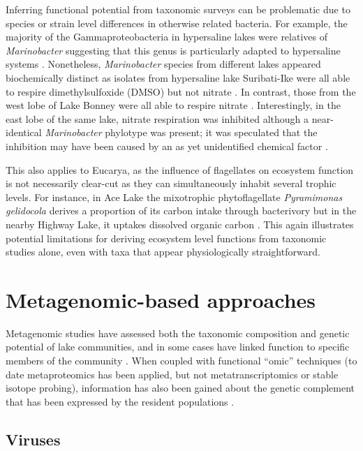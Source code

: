 Inferring functional potential from taxonomic surveys can be problematic due to species or strain level differences in otherwise related bacteria.
For example, the majority of the Gammaproteobacteria in hypersaline lakes were relatives of \textit{Marinobacter} suggesting that this genus is particularly adapted to hypersaline systems
\cite{Bowman2000b, Glatz2006, Matsuzaki2006, Mosier2007}.
Nonetheless, \textit{Marinobacter} species from different lakes appeared biochemically distinct
 as isolates from hypersaline lake Suribati-Ike were all able to respire dimethylsulfoxide (DMSO) but not nitrate \cite{Matsuzaki2006}. 
In contrast, those from the west lobe of Lake Bonney were all able to respire nitrate \cite{Ward1997}. 
Interestingly, in the east lobe of the same lake, nitrate respiration was inhibited although a near-identical \textit{Marinobacter} phylotype was present; 
it was speculated that the inhibition may have been caused by an as yet unidentified chemical factor \cite{Ward2005, Glatz2006}. 

This also applies to Eucarya, as the influence of flagellates on ecosystem function is not necessarily clear-cut as they can simultaneously inhabit several trophic levels. 
For instance, in Ace Lake the mixotrophic phytoflagellate \textit{Pyramimonas gelidocola} derives a proportion of its carbon intake through bacterivory \cite{Bell2003} 
but in the nearby Highway Lake, it uptakes dissolved organic carbon \cite{Laybourn-Parry2005}. 
This again illustrates potential limitations for deriving ecosystem level functions from taxonomic studies alone, even with taxa that appear physiologically straightforward. 

\section{Metagenomic-based approaches}
Metagenomic studies have assessed both the taxonomic composition and genetic potential of lake communities, and in some cases have linked function to specific members of the community 
\cite{Lopez-Bueno2009, Ng2010, Lauro2011, Yau2011, Varin2012}.%
When coupled with functional ``omic'' techniques (to date metaproteomics has been applied, but not metatranscriptomics or stable isotope probing), 
information has also been gained about the genetic complement that has been expressed by the resident populations \cite{Ng2010 Lauro2011, Yau2011}.
\subsection{Viruses}


